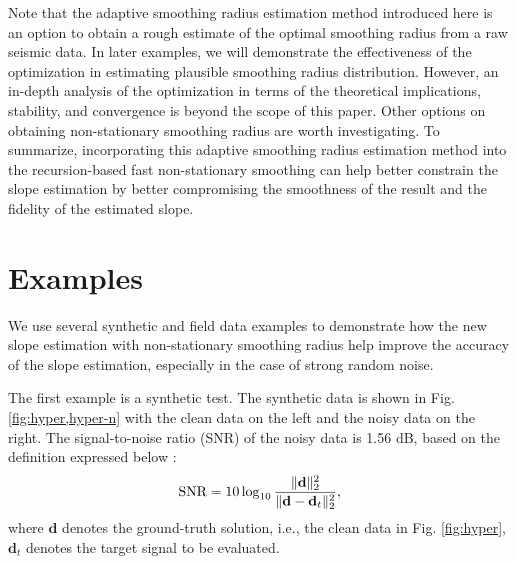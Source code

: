 Note that the adaptive smoothing radius estimation method introduced here is an option to obtain a rough estimate of the optimal smoothing radius from a raw seismic data. In later examples, we will demonstrate the effectiveness of the optimization in estimating plausible smoothing radius distribution. However, an in-depth analysis of the optimization in terms of the theoretical implications, stability, and convergence is beyond the scope of this paper. Other options on obtaining non-stationary smoothing radius are worth investigating. To summarize, incorporating this adaptive smoothing radius estimation method into the recursion-based fast non-stationary smoothing can help better constrain the slope estimation by better compromising the smoothness of the result and the fidelity of the estimated slope. 

\section{Examples}
We use several synthetic and field data examples to demonstrate how the new slope estimation with non-stationary smoothing radius help improve the accuracy of the slope estimation, especially in the case of strong random noise. 

The first example is a synthetic test. The synthetic data is shown in Fig. \ref{fig:hyper,hyper-n} with the clean data on the left and the noisy data on the right. The signal-to-noise ratio (SNR) of the noisy data is 1.56 dB, based on the definition expressed below \cite[]{benfeng2019efficient}:
\begin{equation}
\label{eq:diff}
\text{SNR}=10\log_{10}\frac{\Arrowvert \mathbf{d} \Arrowvert_2^2}{\Arrowvert \mathbf{d} -\mathbf{d}_t\Arrowvert_2^2},
\end{equation}
where $\mathbf{d}$ denotes the ground-truth solution, i.e., the clean data in Fig. \ref{fig:hyper},  $\mathbf{d}_t$ denotes the target signal to be evaluated. 

